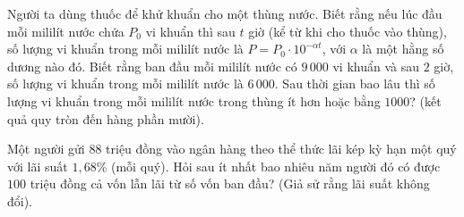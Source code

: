 \begin{ex}%
Người ta dùng thuốc để khử khuẩn cho một thùng nước. Biết rằng nếu lúc đầu mỗi mililít nước chứa $P_0$ vi khuẩn thì sau $ t$ giờ (kể từ khi cho thuốc vào thùng), số lượng vi khuẩn trong mỗi mililít nước là $ P=P_0\cdot{10^{-\alpha t}}$, với $\alpha $ là một hằng số dương nào đó. Biết rằng ban đầu mỗi mililít nước có $9\,000$ vi khuẩn và sau $2$ giờ, số lượng vi khuẩn trong mỗi mililít nước là $6\,000$. Sau thời gian bao lâu thì số lượng vi khuẩn trong mỗi mililít nước trong thùng ít hơn hoặc bằng $1000$? (kết quả quy tròn đến hàng phần mười).
\end{ex}

\begin{ex}%
Một người gửi $88$ triệu đồng vào ngân hàng theo thể thức lãi kép kỳ hạn một quý với lãi suất $1{,}68\%$ (mỗi quý). Hỏi sau ít nhất bao nhiêu năm người đó có được $100$ triệu đồng cả vốn lẫn lãi từ số vốn ban đầu? (Giả sử rằng lãi suất không đổi).
\par
{}
\end{ex}

